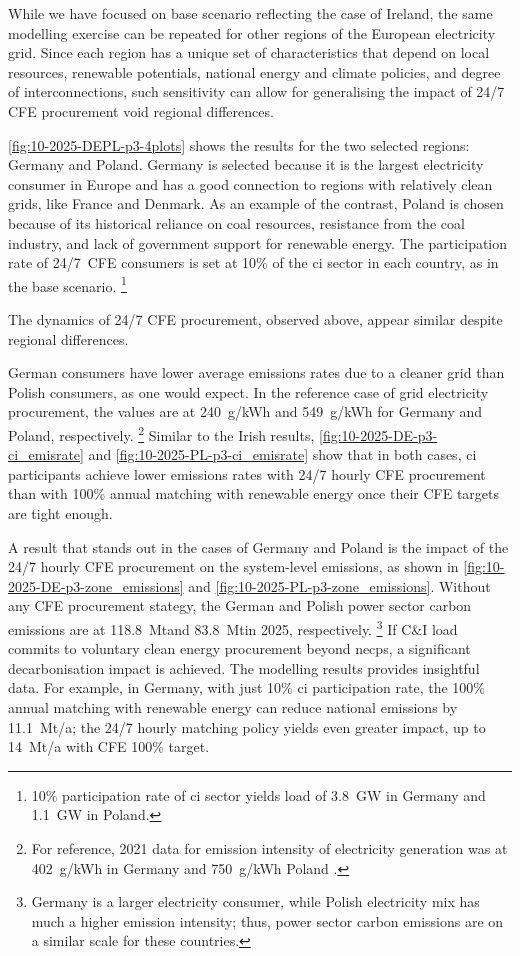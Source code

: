 While we have focused on base scenario reflecting the case of Ireland, the same modelling exercise can be repeated for other regions of the European electricity grid.
Since each region has a unique set of characteristics that depend on local resources, renewable potentials, national energy and climate policies, and degree of interconnections, such sensitivity can allow for generalising the impact of 24/7 CFE procurement void regional differences.

\cref{fig:10-2025-DEPL-p3-4plots} shows the results for the two selected regions: Germany and Poland. 
Germany is selected because it is the largest electricity consumer in Europe and has a good connection to regions with relatively clean grids, like France and Denmark. 
As an example of the contrast, Poland is chosen because of its historical reliance on coal resources, resistance from the coal industry, and lack of government support for renewable energy.
The participation rate of 24/7~CFE consumers is set at 10\% of the \gls{ci} sector in each country, as in the base scenario.%
\footnote{10\% participation rate of \gls{ci} sector yields load of 3.8~GW in Germany and 1.1~GW in Poland.}

The dynamics of 24/7 CFE procurement, observed above, appear similar despite regional differences.

German consumers have lower average emissions rates due to a cleaner grid than Polish consumers, as one would expect.
In the reference case of grid electricity procurement, the values are at 240~g\co/kWh and 549~g\co/kWh for Germany and Poland, respectively.%
\footnote{For reference, 2021 data for emission intensity of electricity generation was at 402~g\co/kWh in Germany and 750~g\co/kWh Poland \cite{EEA-GNGEmissionsEU}.}
Similar to the Irish results, \cref{fig:10-2025-DE-p3-ci_emisrate} and \cref{fig:10-2025-PL-p3-ci_emisrate} show that in both cases, \gls{ci} participants achieve lower emissions rates with 24/7 hourly CFE procurement than with 100\% annual matching with renewable energy once their CFE targets are tight enough. 

A result that stands out in the cases of Germany and Poland is the impact of the 24/7 hourly CFE procurement on the system-level \co emissions, as shown in \cref{fig:10-2025-DE-p3-zone_emissions} and \cref{fig:10-2025-PL-p3-zone_emissions}.
Without any CFE procurement stategy, the German and Polish power sector carbon emissions are at 118.8~Mt\co and 83.8~Mt\co in 2025, respectively.%
\footnote{Germany is a larger electricity consumer, while Polish electricity mix has much a higher emission intensity; thus, power sector carbon emissions are on a similar scale for these countries.} 
If C\&I load commits to voluntary clean energy procurement beyond \gls{necp}s, a significant decarbonisation impact is achieved. 
The modelling results provides insightful data.
For example, in Germany, with just 10\% \gls{ci} participation rate, the 100\% annual matching with renewable energy can reduce national emissions by 11.1~Mt\co/a; the 24/7 hourly matching policy yields even greater impact, up to 14~Mt\co/a with CFE 100\% target.

